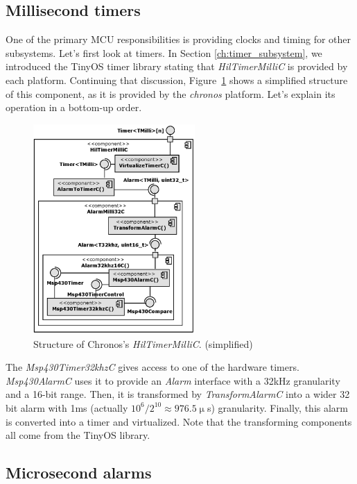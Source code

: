 \subsection{Millisecond timers}

One of the primary MCU responsibilities is providing clocks and timing for other subsystems. Let's first look at timers. In Section \ref{ch:timer_subsystem}, we introduced the TinyOS timer library stating that \emph{HilTimerMilliC} is provided by each platform. Continuing that discussion, Figure~\ref{fig:hil_timer_milli_c} shows a simplified structure of this component, as it is provided by the \emph{chronos} platform.
Let's explain its operation in a bottom-up order.
\begin{figure}[h!]
  \centering
  \includegraphics[width=0.55\textwidth]{diagrams/hil_timer_milli_c.eps}
  \caption{Structure of Chronos's \emph{HilTimerMilliC}. (simplified)}
  \label{fig:hil_timer_milli_c}
\end{figure}

The \emph{Msp430Timer32khzC} gives access to one of the hardware timers. \emph{Msp430AlarmC} uses it to provide an \emph{Alarm} interface with a 32kHz granularity and a 16-bit range. Then, it is transformed by \emph{TransformAlarmC} into a wider 32 bit alarm with 1ms (actually $10^6 / 2^{10} \approx 976.5\upmu$s) granularity. Finally, this alarm is converted into a timer and virtualized. Note that the transforming components all come from the TinyOS library.

\subsection{Microsecond alarms}

